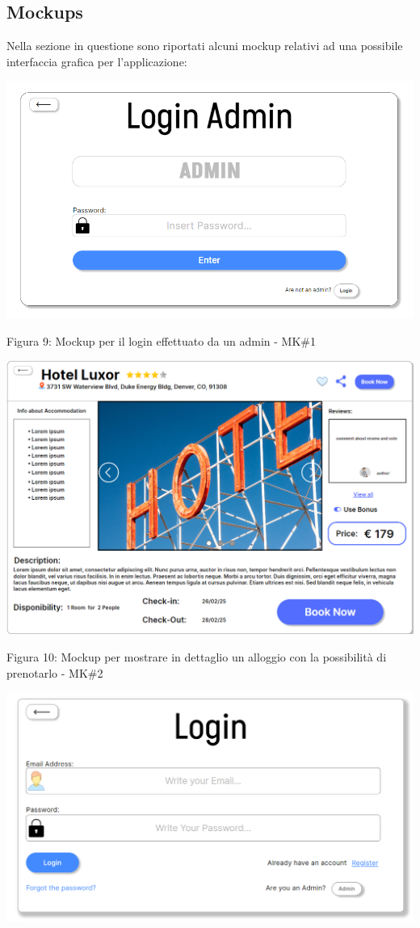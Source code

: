 \documentclass[10pt]{article}
\begin{document}
\subsection{Mockups}
Nella sezione in questione sono riportati alcuni mockup relativi ad una possibile interfaccia grafica per l'applicazione:
\begin{center}
\includegraphics[scale=0.6]{Mockup/MockupAdminLogin}
\par\medskip
Figura 9: Mockup per il login effettuato da un admin - MK\#1 
\par\medskip
\par\medskip
\includegraphics[scale=0.5]{Mockup/mockupBooking}
\par\medskip
\par\medskip
Figura 10: Mockup per mostrare in dettaglio un alloggio con la possibilità di prenotarlo - MK\#2
\par\medskip
\includegraphics[scale=0.5]{Mockup/MockupLogin}

\end{center}
\end{document}
